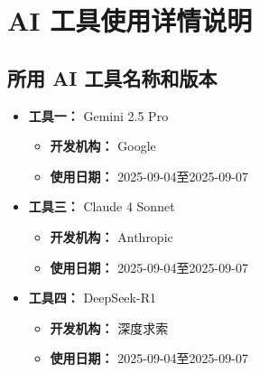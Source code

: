 \documentclass[a4paper]{ctexart}
\begin{document}
\section{AI 工具使用详情说明}

\subsection{所用 AI 工具名称和版本}
\begin{itemize}
    \item \textbf{工具一：} Gemini 2.5 Pro
        \begin{itemize}[label={}, leftmargin=*] 
            \item \textbf{开发机构：} Google
            \item \textbf{使用日期：} 2025-09-04至2025-09-07
        \end{itemize}
        
    \item \textbf{工具三：} Claude 4 Sonnet
        \begin{itemize}[label={}, leftmargin=*]
            \item \textbf{开发机构：} Anthropic
            \item \textbf{使用日期：} 2025-09-04至2025-09-07
        \end{itemize}

    \item \textbf{工具四：} DeepSeek-R1
        \begin{itemize}[label={}, leftmargin=*]
            \item \textbf{开发机构：} 深度求索
            \item \textbf{使用日期：} 2025-09-04至2025-09-07
        \end{itemize}
\end{itemize}
\end{document}
